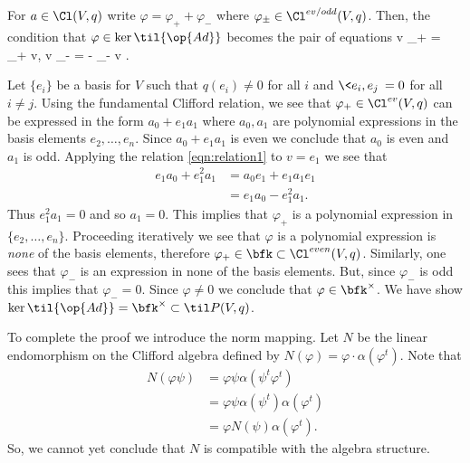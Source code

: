 \documentclass[../main.tex]{subfiles}
\begin{document}
\subsection{}

For $a \in \Cl(V,q)$ write $\varphi = \varphi_+ + \varphi_-$ where $\varphi_{\pm} \in \Cl^{ev/odd}(V,q)$.
Then, the condition that $\varphi \in \ker \til{\op{Ad}}$ becomes the pair of equations
\beqn\label{eqn:relation1}
v \varphi_+ = \varphi_+ v, \quad v \varphi_- = - \varphi_- v .
\eeqn

Let $\{e_i\}$ be a basis for $V$ such that $q(e_i) \ne 0$ for all $i$ and $\<e_i,e_j\> = 0$ for all $i \ne j$.
Using the fundamental Clifford relation, we see that $\varphi_+ \in \Cl^{ev}(V,q)$ can be expressed in the form $a_0 + e_1 a_1$ where $a_0,a_1$ are polynomial expressions in the basis elements $e_2, \ldots, e_n$.
Since $a_0 + e_1 a_1$ is even we conclude that $a_0$ is even and $a_1$ is odd. 
Applying the relation \eqref{eqn:relation1} to $v = e_1$ we see that
\begin{align*}
e_1 a_0 + e_1^2 a_1 & = a_0 e_1 + e_1 a_1 e_1 \\ & = e_1 a_0 - e_1^2 a_1 .
\end{align*}
Thus $e_1^2 a_1 =0$ and so $a_1=0$.
This implies that $\varphi_+$ is a polynomial expression in $\{e_2,\ldots,e_n\}$.
Proceeding iteratively we see that $\varphi$ is a polynomial expression is \textit{none} of the basis elements, therefore $\varphi_+ \in \bfk \subset \Cl^{even}(V,q)$.
Similarly, one sees that $\varphi_-$ is an expression in none of the basis elements.
But, since $\varphi_-$ is odd this implies that $\varphi_- = 0$.
Since $\varphi \ne 0$ we conclude that $\varphi \in \bfk^\times$.
We have show $\ker \til{\op{Ad}} = \bfk^\times \subset \til P(V,q)$.


To complete the proof we introduce the norm mapping. 
Let $N$ be the linear endomorphism on the Clifford algebra defined by $N(\varphi) = \varphi \cdot \alpha(\varphi^t)$.
Note that 
\begin{align*}
N(\varphi \psi) & = \varphi \psi \alpha(\psi^t \varphi^t) \\ & = \varphi \psi \alpha(\psi^t) \alpha(\varphi^t) \\ & = \varphi N(\psi) \alpha(\varphi^t) .
\end{align*}
So, we cannot yet conclude that $N$ is compatible with the algebra structure.
\end{document}
